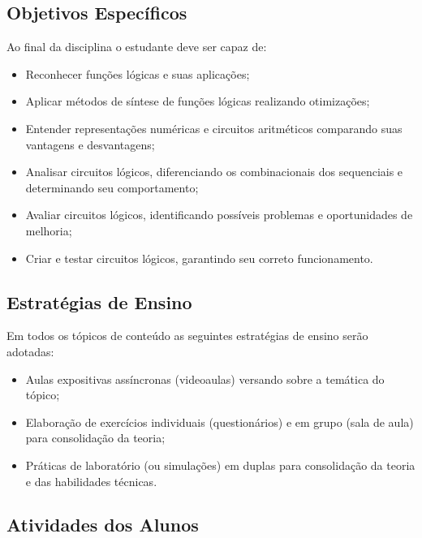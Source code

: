 \subsection{Objetivos Específicos} %

\begin{frame}{\insertsubsection} 
Ao final da disciplina o estudante deve ser capaz de:
	\begin{itemize}
		\item Reconhecer funções lógicas e suas aplicações; 
		\item Aplicar métodos de síntese de funções lógicas realizando otimizações; 
		\item Entender representações numéricas e circuitos aritméticos comparando suas vantagens e desvantagens; 
		\item Analisar circuitos lógicos, diferenciando os combinacionais dos sequenciais e determinando seu comportamento; 
		\item Avaliar circuitos lógicos, identificando possíveis problemas e oportunidades de melhoria;
		\item Criar e testar circuitos lógicos, garantindo seu correto funcionamento. 
	\end{itemize}
\end{frame}

\subsection{Estratégias de Ensino} %

\begin{frame}{\insertsubsection} 
    Em todos os tópicos de conteúdo as seguintes estratégias de ensino serão adotadas:	
    \begin{itemize}
        \item Aulas expositivas assíncronas (videoaulas) versando sobre a temática do tópico;
        \item Elaboração de exercícios individuais (questionários) e em grupo (sala de aula) para consolidação da teoria; 
        \item Práticas de laboratório (ou simulações) em duplas para consolidação da teoria e das habilidades técnicas.
	\end{itemize}
\end{frame}

\subsection{Atividades dos Alunos} %

